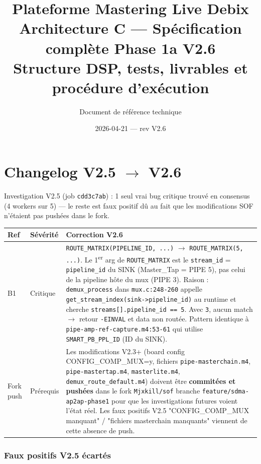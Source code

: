 \documentclass[11pt,a4paper]{article}
\title{\textbf{Plateforme Mastering Live Debix}\\[6pt]
  \Large Architecture C --- Spécification complète Phase 1a \textbf{V2.6}\\[4pt]
  \large Structure DSP, tests, livrables et procédure d'exécution}
\author{Document de référence technique}
\date{2026-04-21 --- rev V2.6}
\begin{document}
\maketitle
\tableofcontents
\clearpage

\section*{Changelog V2.5 $\rightarrow$ V2.6}

Investigation V2.5 (job \texttt{cdd3c7ab}) : 1 seul vrai bug critique trouvé en consensus (4 workers sur 5) --- le reste est faux positif dû au fait que les modifications SOF n'étaient pas pushées dans le fork.

\begin{center}
\begin{tabularx}{\textwidth}{llX}
\toprule
\textbf{Ref} & \textbf{Sévérité} & \textbf{Correction V2.6} \\
\midrule
B1 & Critique & \texttt{ROUTE\_MATRIX(PIPELINE\_ID, ...)} $\rightarrow$ \texttt{ROUTE\_MATRIX(5, ...)}. Le 1\textsuperscript{er} arg de \texttt{ROUTE\_MATRIX} est le \texttt{stream\_id} = \texttt{pipeline\_id} du SINK (Master\_Tap = PIPE 5), pas celui de la pipeline hôte du mux (PIPE 3). Raison : \texttt{demux\_process} dans \texttt{mux.c:248-260} appelle \texttt{get\_stream\_index(sink->pipeline\_id)} au runtime et cherche \texttt{streams[].pipeline\_id == 5}. Avec \texttt{3}, aucun match $\rightarrow$ retour \texttt{-EINVAL} et data non routée. Pattern identique à \texttt{pipe-amp-ref-capture.m4:53-61} qui utilise \texttt{SMART\_PB\_PPL\_ID} (ID du SINK). \\
Fork push & Prérequis & Les modifications V2.3+ (board config CONFIG\_COMP\_MUX=y, fichiers \texttt{pipe-masterchain.m4}, \texttt{pipe-mastertap.m4}, \texttt{masterlite.m4}, \texttt{demux\_route\_default.m4}) doivent être \textbf{commitées et pushées} dans le fork \texttt{Mjxkill/sof} branche \texttt{feature/sdma-ap2ap-phase1} pour que les investigations futures voient l'état réel. Les faux positifs V2.5 "CONFIG\_COMP\_MUX manquant" / "fichiers masterchain manquants" viennent de cette absence de push. \\
\bottomrule
\end{tabularx}
\end{center}

\subsubsection*{Faux positifs V2.5 écartés}
\end{document}
